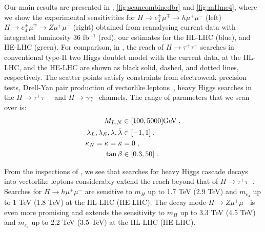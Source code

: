 Our main results are presented in , \ref{fig:scancombinedbr} and \ref{fig:mHme4}, where we show the experimental sensitivities for $H \to e_4^\pm \mu^\mp \to h \mu^+ \mu^-$ (left) $H \to e_4^\pm \mu^\mp \to Z \mu^+ \mu^-$ (right) obtained from reanalysing current data with integrated luminosity 36 fb$^{-1}$ (red), our estimates for the HL-LHC (blue), and HE-LHC (green). For comparison, in , the reach of $H \to \tau^+ \tau^-$ searches in conventional type-II two Higgs doublet model with the current data, at the HL-LHC, and the HE-LHC are shown as black solid, dashed, and dotted lines, respectively. The scatter points satisfy constraints from electroweak precision tests, Drell-Yan pair production of vectorlike leptons~\cite{Dermisek:2014qca}, heavy Higgs searches in the $H \to \tau^+ \tau^-$~\cite{Aaboud:2017sjh} and $H \to \gamma \gamma$~\cite{Khachatryan:2016yec, Aaboud:2017yyg} channels. The range of parameters that we scan over is:
%
\begin{align}
M_{L,N} &\in [100, 5000] {\rm GeV} \; , \\
\lambda_L, \lambda_E, \lambda, \bar \lambda &\in [-1, 1] \; , \\
\kappa_N = \kappa = \bar \kappa &= 0 \; , \\
\tan\beta & \in [0.3, 50] \; .
\label{eq:scan}
\end{align}
%

From the inspections of , we see that searches for heavy Higgs cascade decays into vectorlike leptons considerably extend the reach beyond that of $H\to \tau^+\tau^-$. Searches for $H\to h\mu^+\mu^-$ are sensitive to $m_H$ up to 1.7 TeV (2.9 TeV) and $m_{e_4}$ up to 1 TeV (1.8 TeV) at the HL-LHC (HE-LHC). The decay mode $H\to Z\mu^+\mu^-$ is even more promising and extends the sensitivity to $m_H$ up to 3.3 TeV (4.5 TeV) and $m_{e_4}$ up to 2.2 TeV (3.5 TeV) at the HL-LHC (HE-LHC).



